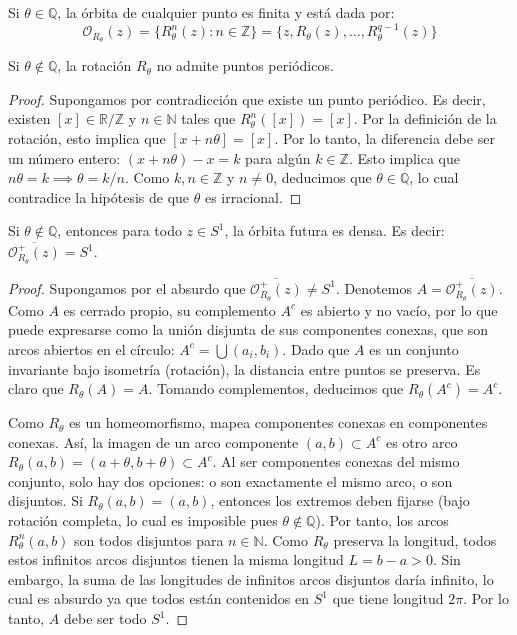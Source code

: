 \begin{observacion}
	Si $\theta \in \mathbb{Q}$, la órbita de cualquier punto es finita y está dada por:
	$$\mathcal{O}_{R_\theta}(z) = \{R_\theta^n(z) : n \in \mathbb{Z}\} = \{z, R_\theta(z), \dots, R_\theta^{q-1}(z)\}$$
\end{observacion}

\begin{proposicion}
	Si $\theta \notin \mathbb{Q}$, la rotación $R_\theta$ no admite puntos periódicos.
\end{proposicion}

\begin{proof}
	Supongamos por contradicción que existe un punto periódico. Es decir, existen $[x] \in \mathbb{R}/\mathbb{Z}$ y $n \in \mathbb{N}$ tales que $R_\theta^n([x]) = [x]$. Por la definición de la rotación, esto implica que $[x + n\theta] = [x]$.
	Por lo tanto, la diferencia debe ser un número entero: $(x + n\theta) - x = k$ para algún $k \in \mathbb{Z}$. Esto implica que $n\theta = k \implies \theta = k/n$. Como $k, n \in \mathbb{Z}$ y $n \neq 0$, deducimos que $\theta \in \mathbb{Q}$, lo cual contradice la hipótesis de que $\theta$ es irracional.
\end{proof}

\begin{teorema}
	Si $\theta \notin \mathbb{Q}$, entonces para todo $z \in S^1$, la órbita futura es densa. Es decir: $\overline{\mathcal{O}_{R_\theta}^+(z)} = S^1$.
\end{teorema}

\begin{proof}
	Supongamos por el absurdo que $\overline{\mathcal{O}_{R_\theta}^+(z)} \neq S^1$. Denotemos $A = \overline{\mathcal{O}_{R_\theta}^+(z)}$. Como $A$ es cerrado propio, su complemento $A^c$ es abierto y no vacío, por lo que puede expresarse como la unión disjunta de sus componentes conexas, que son arcos abiertos en el círculo: $A^c = \bigcup (a_i, b_i)$.
	Dado que $A$ es un conjunto invariante bajo isometría (rotación), la distancia entre puntos se preserva. Es claro que $R_\theta(A) = A$. Tomando complementos, deducimos que $R_\theta(A^c) = A^c$.
	
	Como $R_\theta$ es un homeomorfismo, mapea componentes conexas en componentes conexas. Así, la imagen de un arco componente $(a, b) \subset A^c$ es otro arco $R_\theta(a, b) = (a+\theta, b+\theta) \subset A^c$. Al ser componentes conexas del mismo conjunto, solo hay dos opciones: o son exactamente el mismo arco, o son disjuntos.
	Si $R_\theta(a, b) = (a, b)$, entonces los extremos deben fijarse (bajo rotación completa, lo cual es imposible pues $\theta \notin \mathbb{Q}$). Por tanto, los arcos $R_\theta^n(a, b)$ son todos disjuntos para $n \in \mathbb{N}$.
	Como $R_\theta$ preserva la longitud, todos estos infinitos arcos disjuntos tienen la misma longitud $L = b-a > 0$. Sin embargo, la suma de las longitudes de infinitos arcos disjuntos daría infinito, lo cual es absurdo ya que todos están contenidos en $S^1$ que tiene longitud $2\pi$. Por lo tanto, $A$ debe ser todo $S^1$.
\end{proof}


